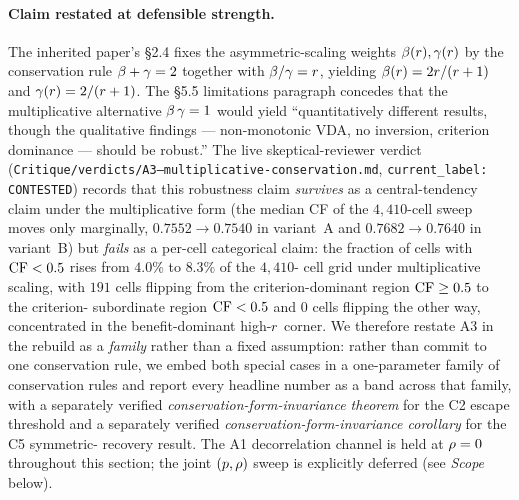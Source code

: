 \paragraph{Claim restated at defensible strength.}
The inherited paper's §2.4 fixes the asymmetric-scaling weights
$\beta(r), \gamma(r)$ by the conservation rule
$\beta + \gamma = 2$ together with $\beta/\gamma = r$,
yielding $\beta(r) = 2r/(r + 1)$ and
$\gamma(r) = 2/(r + 1)$. The §5.5 limitations paragraph
concedes that the multiplicative alternative $\beta\,\gamma = 1$
would yield ``quantitatively different results, though the
qualitative findings --- non-monotonic VDA, no inversion, criterion
dominance --- should be robust.'' The live skeptical-reviewer verdict
(\texttt{Critique/verdicts/A3--multiplicative-conservation.md},
\texttt{current\_label: CONTESTED}) records that this robustness claim
\emph{survives} as a central-tendency claim under the multiplicative
form (the median CF of the $4{,}410$-cell sweep moves only marginally,
$0.7552 \to 0.7540$ in variant~A and $0.7682 \to 0.7640$ in variant~B)
but \emph{fails} as a per-cell categorical claim: the fraction of
cells with $\mathrm{CF} < 0.5$ rises from $4.0\%$ to $8.3\%$ of the $4{,}410$-
cell grid under multiplicative scaling, with $191$ cells flipping from
the criterion-dominant region $\mathrm{CF} \ge 0.5$ to the criterion-
subordinate region $\mathrm{CF} < 0.5$ and $0$ cells flipping the other way,
concentrated in the benefit-dominant high-$r$ corner. We
therefore restate A3 in the rebuild as a \emph{family} rather than a
fixed assumption: rather than commit to one conservation rule, we
embed both special cases in a one-parameter family of conservation
rules and report every headline number as a band across that family,
with a separately verified \emph{conservation-form-invariance theorem}
for the C2 escape threshold and a separately verified
\emph{conservation-form-invariance corollary} for the C5 symmetric-
recovery result. The A1 decorrelation channel is held at
$\rho = 0$ throughout this section; the joint $(p, \rho)$ sweep is
explicitly deferred (see \emph{Scope} below).

